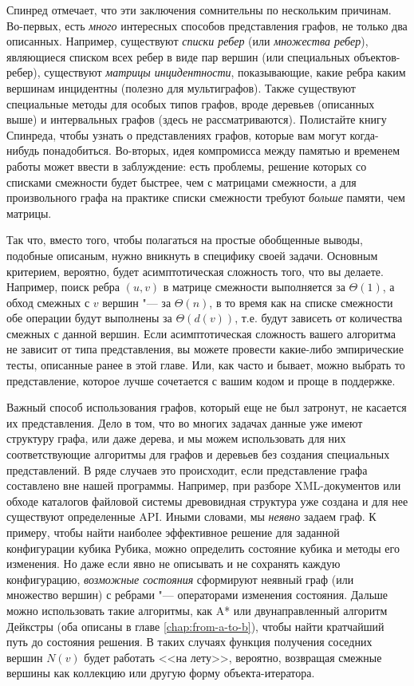 Спинред отмечает, что эти заключения сомнительны по нескольким причинам. Во-первых, есть \textit{много} интересных способов представления графов, не только два описанных. Например, существуют \textit{списки ребер} (или \textit{множества ребер}), являющиеся списком всех ребер в виде пар вершин (или специальных объектов-ребер), существуют \textit{матрицы инцидентности}, показывающие, какие ребра каким вершинам инцидентны (полезно для мультиграфов). Также существуют специальные методы для особых типов графов, вроде деревьев (описанных выше) и интервальных графов (здесь не рассматриваются). Полистайте книгу Спинреда, чтобы узнать о представлениях графов, которые вам могут когда-нибудь понадобиться.
Во-вторых, идея компромисса между памятью и временем работы может ввести в заблуждение: есть проблемы, решение которых со списками смежности будет быстрее, чем с матрицами смежности, а для произвольного графа на практике списки смежности требуют \textit{больше} памяти, чем матрицы.

Так что, вместо того, чтобы полагаться на простые обобщенные выводы, подобные описаным, нужно вникнуть в специфику своей задачи. Основным критерием, вероятно, будет асимптотическая сложность того, что вы делаете. Например, поиск ребра $(u, v)$ в матрице смежности выполняется за $\Theta(1)$, а обход смежных с $v$ вершин "--- за $\Theta(n)$, в то время как на списке смежности обе операции будут выполнены за $\Theta(d(v))$, т.е. будут зависеть от количества смежных с данной вершин. 
Если асимптотическая сложность вашего алгоритма не зависит от типа представления, вы можете провести какие-либо эмпирические тесты, описанные ранее в этой главе. Или, как часто и бывает, можно выбрать то представление, которое лучше сочетается с вашим кодом и проще в поддержке.

Важный способ использования графов, который еще не был затронут, не касается их представления. Дело в том, что во многих задачах данные уже имеют структуру графа, или даже дерева, и мы можем использовать для них соответствующие алгоритмы для графов и деревьев без создания специальных представлений. В ряде случаев это происходит, если представление графа составлено вне нашей программы. Например, при разборе XML-документов или обходе каталогов файловой системы древовидная структура уже создана и для нее существуют определенные API. Иными словами, мы \textit{неявно} задаем граф. К примеру, чтобы найти наиболее эффективное решение для заданной конфигурации кубика Рубика, можно определить состояние кубика и методы его изменения. Но даже если явно не описывать и не сохранять каждую конфигурацию, \textit{возможные состояния} сформируют неявный граф (или множество вершин) с ребрами "--- операторами изменения состояния. Дальше можно использовать такие алгоритмы, как A* или двунаправленный алгоритм Дейкстры (оба описаны в главе \ref{chap:from-a-to-b}), чтобы найти кратчайший путь до состояния решения. В таких случаях функция получения соседних вершин $N(v)$ будет работать <<на лету>>, вероятно, возвращая смежные вершины как коллекцию или другую форму объекта-итератора.

